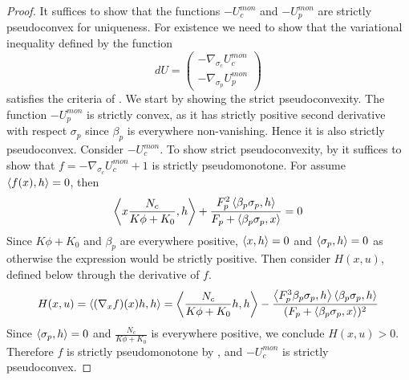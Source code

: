 \begin{proof}
  It suffices to show that the functions $-U_c^{mon}$ and $-U_p^{mon}$ are strictly pseudoconvex for uniqueness. For existence we need to show that the variational inequality defined by the function
  \begin{equation}
    \label{eq:var_ineq}
    dU = \begin{pmatrix}-\nabla_{\sigma_c} U_c^{mon} \\ -\nabla_{\sigma_p} U_p^{mon}\end{pmatrix}
  \end{equation} satisfies the criteria of .
  We start by showing the strict pseudoconvexity. The function $-U_p^{mon}$ is strictly convex, as it has strictly positive second derivative with respect $\sigma_p$ since $\beta_p$ is everywhere non-vanishing. Hence it is also strictly pseudoconvex. Consider $-U_c^{mon}$. To show strict pseudoconvexity, by  it suffices to show that $f = -\nabla_{\sigma_c} U_c^{mon} + 1$ is strictly pseudomonotone. For  assume $\left \langle f(x),h \right \rangle = 0$, then
  \begin{equation}
    \ip{x \frac{N_c}{K\phi + K_0} }{h} + \frac{F_p^2 \ip{\beta_p \sigma_p}{h}}{F_p + \ip{\beta_p \sigma_p}{x}} = 0
  \end{equation}
  Since $K\phi + K_0$ and $\beta_p$ are everywhere positive, $\left \langle x,h \right \rangle = 0$ and $\left \langle \sigma_p,h \right \rangle = 0$ as otherwise the expression would be strictly positive. Then consider $H(x,u)$, defined below through the derivative of $f$.
  \begin{equation}
    H(x,u)=\ip{(\nabla_x f)(x)h}{h} = \ip{\frac{N_c}{K\phi + K_0}  h}{h} - \frac{\ip{F_p^3 \beta_p \sigma_p}{h}\ip{\beta_p \sigma_p}{h}}{(F_p + \ip{\beta_p \sigma_p}{x})^2}
  \end{equation}
  Since $\left \langle \sigma_p,h \right \rangle=0$ and $\frac{N_c}{K\phi + K_0}$ is everywhere positive, we conclude $H(x,u)>0$. Therefore $f$ is strictly pseudomonotone by , and $-U_c^{mon}$ is strictly pseudoconvex.


\end{proof}
